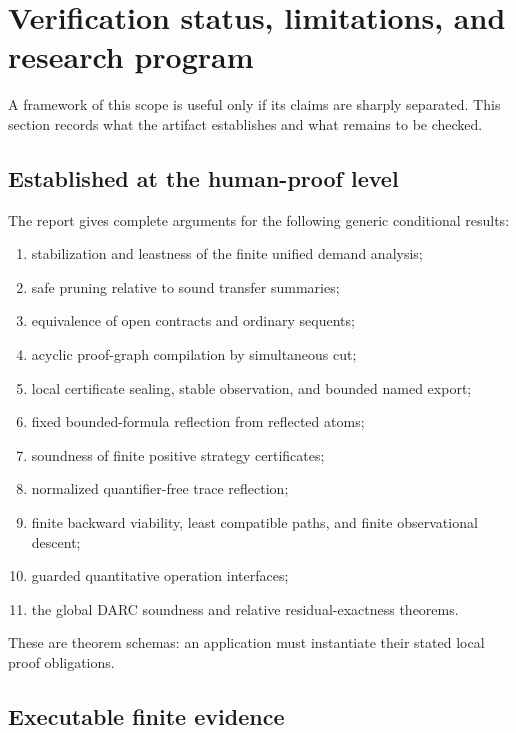 \section{Verification status, limitations, and research program}
\label{sec:status}

A framework of this scope is useful only if its claims are sharply separated.
This section records what the artifact establishes and what remains to be
checked.

\subsection{Established at the human-proof level}

The report gives complete arguments for the following generic conditional
results:
\begin{enumerate}
  \item stabilization and leastness of the finite unified demand analysis;
  \item safe pruning relative to sound transfer summaries;
  \item equivalence of open contracts and ordinary sequents;
  \item acyclic proof-graph compilation by simultaneous cut;
  \item local certificate sealing, stable observation, and bounded named
        export;
  \item fixed bounded-formula reflection from reflected atoms;
  \item soundness of finite positive strategy certificates;
  \item normalized quantifier-free trace reflection;
  \item finite backward viability, least compatible paths, and finite
        observational descent;
  \item guarded quantitative operation interfaces;
  \item the global DARC soundness and relative residual-exactness theorems.
\end{enumerate}
These are theorem schemas: an application must instantiate their stated local
proof obligations.

\subsection{Executable finite evidence}

